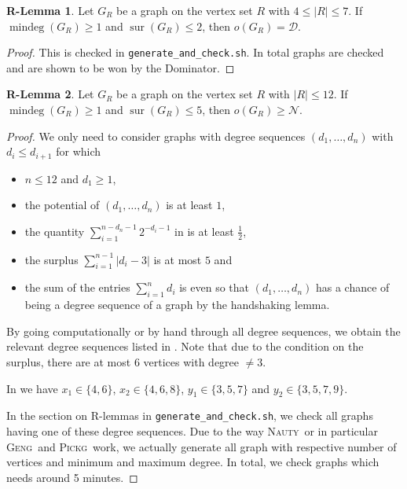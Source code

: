 \documentclass[a4paper,11pt,oneside]{scrartcl}
\theoremstyle{definition}
\newtheorem{r-lemma}{R-Lemma}
\theoremstyle{remark}
\DeclareMathOperator{\mindeg}{mindeg}
\DeclareMathOperator{\sur}{sur}
\newcommand{\nauty}{\textsc{Nauty}}
\newcommand{\geng}{\textsc{Geng}}
\newcommand{\pickg}{\textsc{Pickg}}
\begin{document}
\begin{r-lemma}\label{r-lemma:R_7_i=s+2}
    Let $G_{R}$ be a graph on the vertex set $R$ with $4 \leq |R| \leq 7$. If $\mindeg(G_R) \geq 1$ and $\sur(G_R) \leq 2$, then $o(G_R) = \mathcal D$. 
\end{r-lemma}
\begin{proof}
    This is checked in \texttt{generate\_and\_check.sh}. In total  graphs are checked and are shown to be won by the Dominator.
\end{proof}


\begin{r-lemma}\label{r-lemma:R_12}
    Let $G_{R}$ be a graph on the vertex set $R$ with $|R| \leq 12$. If $\mindeg(G_R) \geq 1$ and $\sur(G_R) \leq 5$, then $o(G_R) \geq \mathcal N$. 
\end{r-lemma}
\begin{proof}
    We only need to consider graphs with degree sequences $(d_1,\dots,d_n)$ with $d_i\leq d_{i+1}$ for which
    \begin{itemize}
        \item $n \leq 12$ and $d_1 \geq 1$,
        \item the potential of $(d_1,\dots,d_n)$ is at least $1$,
        \item the quantity $\sum_{i=1}^{n-d_n-1} 2^{-d_i-1}$ in  is at least $\frac 12$, 
        \item the surplus $\sum_{i = 1}^{n-1} |d_i-3|$ is at most $5$ and 
        \item the sum of the entries $\sum_{i=1}^n d_i$ is even so that $(d_1,\dots,d_n)$ has a chance of being a degree sequence of a graph by the handshaking lemma.
    \end{itemize}
    By going computationally or by hand through all degree sequences, we obtain the relevant degree sequences listed in .
    Note that due to the condition on the surplus, there are at most 6 vertices with degree $\neq3$.
    
    In  we have $x_1\in\{4,6\}$, $x_2\in\{4,6,8\}$, $y_1\in\{3,5,7\}$ and $y_2\in\{3,5,7,9\}$.
    
    In the section on R-lemmas in \texttt{generate\_and\_check.sh}, we check all graphs having one of these degree sequences.
    Due to the way \nauty\ or in particular \geng\ and \pickg\ work, we actually generate all graph with respective number of vertices and minimum and maximum degree.
    In total, we check  graphs which needs around 5 minutes.
\end{proof}
\end{document}
